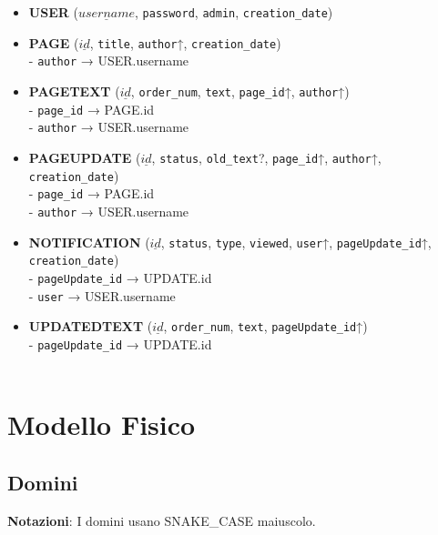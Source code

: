 \documentclass{article}
\begin{document}
	\begin{itemize}
		\item \textbf{USER} ($\underline{username}$, \texttt{password}, \texttt{admin}, \texttt{creation\_date})
		
		\item \textbf{PAGE} ($\underline{id}$, \texttt{title}, \texttt{author}↑, \texttt{creation\_date})
		\\
		- \texttt{author} → USER.username
		
		\item \textbf{PAGETEXT} ($\underline{id}$, \texttt{order\_num}, \texttt{text}, \texttt{page\_id}↑, \texttt{author}↑)
		\\
		- \texttt{page\_id} → PAGE.id	
		\\
		- \texttt{author} → USER.username
		
		\item \textbf{PAGEUPDATE} ($\underline{id}$, \texttt{status}, \texttt{old\_text}?, \texttt{page\_id}↑, \texttt{author}↑, \texttt{creation\_date})
		\\
		- \texttt{page\_id} → PAGE.id
		\\
		- \texttt{author} → USER.username
		
		\item \textbf{NOTIFICATION} ($\underline{id}$, \texttt{status}, \texttt{type}, \texttt{viewed}, \texttt{user}↑, \texttt{pageUpdate\_id}↑, \texttt{creation\_date})
		\\
		- \texttt{pageUpdate\_id} → UPDATE.id
		\\
		- \texttt{user} → USER.username
		
		\item \textbf{UPDATEDTEXT} ($\underline{id}$, \texttt{order\_num}, \texttt{text}, \texttt{pageUpdate\_id}↑)
		\\
		- \texttt{pageUpdate\_id} → UPDATE.id
		\\\\
	\end{itemize}
	
	
	\newpage
	
	\section{Modello Fisico}
	\subsection{Domini}
	\textbf{Notazioni}: I domini usano SNAKE\_CASE maiuscolo.
	\\
		
\end{document}

